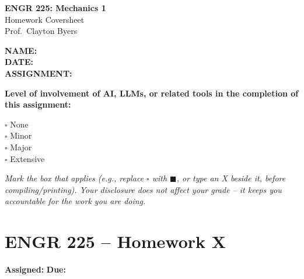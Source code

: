 \documentclass[11pt]{article}
\newcommand{\assignmentNumber}{X}
\newcommand{\assignedDate}{}
\newcommand{\dueDate}{}
\begin{document}
\begin{titlepage}
    \centering
    \vspace*{2cm}
    {\LARGE \bfseries ENGR 225: Mechanics 1} \\[0.3cm]
    {\Large Homework Coversheet} \\[0.3cm]
    {\large Prof.\ Clayton Byers} \\[2cm]

    \begin{flushleft}
        \Large
        \textbf{NAME:} \underline{\hspace{10cm}} \\[1cm]
        \textbf{DATE:} \underline{\hspace{10cm}} \\[1cm]
        \textbf{ASSIGNMENT:} \underline{\hspace{9cm}} \\[2cm]
    \end{flushleft}

    \large
    \textbf{Level of involvement of AI, LLMs, or related tools in the completion of this assignment:}

    \vspace{1cm}

    \begin{flushleft}
        \Large
        $\square$ \quad None \\[0.7cm]
        $\square$ \quad Minor \\[0.7cm]
        $\square$ \quad Major \\[0.7cm]
        $\square$ \quad Extensive \\[1.5cm]
    \end{flushleft}

    \normalsize
    \textit{Mark the box that applies (e.g., replace $\square$ with $\blacksquare$, or type an X beside it, before compiling/printing). Your disclosure does not affect your grade -- it keeps you accountable for the work you are doing.}

\end{titlepage}

\section*{ENGR 225 -- Homework \assignmentNumber}
\textbf{Assigned:} \assignedDate \hfill \textbf{Due:} \dueDate
\end{document}
